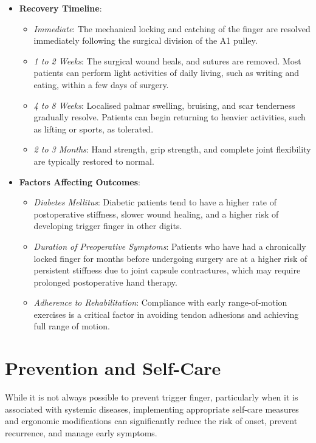 \begin{itemize}
  \item \textbf{Recovery Timeline}:
  \begin{itemize}
    \item \textit{Immediate}: The mechanical locking and catching of the finger are resolved immediately following the surgical division of the A1 pulley.
    \item \textit{1 to 2 Weeks}: The surgical wound heals, and sutures are removed. Most patients can perform light activities of daily living, such as writing and eating, within a few days of surgery.
    \item \textit{4 to 8 Weeks}: Localised palmar swelling, bruising, and scar tenderness gradually resolve. Patients can begin returning to heavier activities, such as lifting or sports, as tolerated.
    \item \textit{2 to 3 Months}: Hand strength, grip strength, and complete joint flexibility are typically restored to normal.
  \end{itemize}
  \item \textbf{Factors Affecting Outcomes}:
  \begin{itemize}
    \item \textit{Diabetes Mellitus}: Diabetic patients tend to have a higher rate of postoperative stiffness, slower wound healing, and a higher risk of developing trigger finger in other digits.
    \item \textit{Duration of Preoperative Symptoms}: Patients who have had a chronically locked finger for months before undergoing surgery are at a higher risk of persistent stiffness due to joint capsule contractures, which may require prolonged postoperative hand therapy.
    \item \textit{Adherence to Rehabilitation}: Compliance with early range-of-motion exercises is a critical factor in avoiding tendon adhesions and achieving full range of motion.
  \end{itemize}
\end{itemize}

\section*{Prevention and Self-Care}
While it is not always possible to prevent trigger finger, particularly when it is associated with systemic diseases, implementing appropriate self-care measures and ergonomic modifications can significantly reduce the risk of onset, prevent recurrence, and manage early symptoms.

